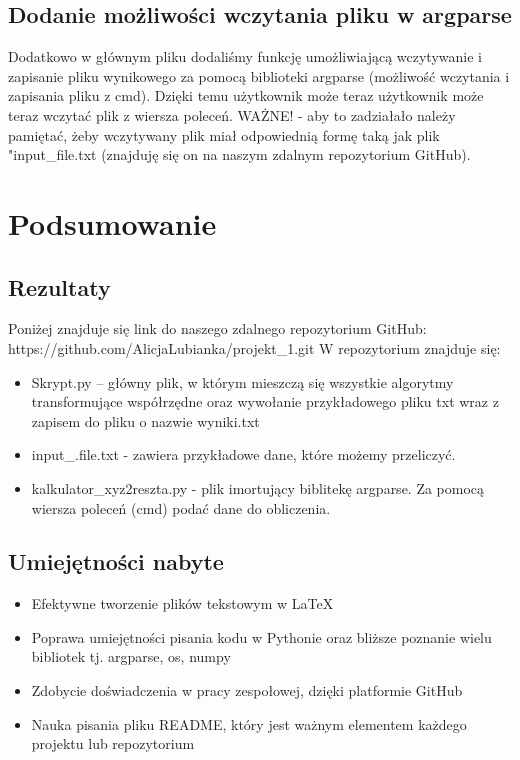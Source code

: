 \documentclass[10pt,a4paper]{article}
\begin{document}
	

	
	\subsection{Dodanie możliwości wczytania pliku w argparse}
	Dodatkowo w głównym pliku dodaliśmy funkcję umożliwiającą wczytywanie i zapisanie pliku wynikowego za pomocą biblioteki argparse (możliwość wczytania i zapisania pliku z cmd). Dzięki temu użytkownik może teraz użytkownik może teraz wczytać plik z wiersza poleceń. 
	WAŻNE! - aby to zadziałało należy pamiętać, żeby wczytywany plik miał odpowiednią formę taką jak plik "input\_{}file.txt (znajduję się on na naszym zdalnym repozytorium GitHub).
	
	\section{Podsumowanie}
	
	\subsection{Rezultaty}
		Poniżej znajduje się link do naszego zdalnego repozytorium GitHub:
	\newline
	https://github.com/AlicjaLubianka/projekt\_{}1.git
	\newline
	W repozytorium znajduje się:
	\begin{itemize}
	 \item Skrypt.py – główny plik, w którym mieszczą się wszystkie algorytmy transformujące współrzędne oraz wywołanie przykładowego pliku txt wraz z zapisem do pliku o nazwie wyniki.txt
	 \item input\_{}.file.txt - zawiera przykładowe dane, które możemy przeliczyć.
	 \item kalkulator\_{}xyz2reszta.py - plik imortujący biblitekę argparse. Za pomocą wiersza poleceń (cmd) podać dane do obliczenia.
	 
	\end{itemize}
	
	\subsection{Umiejętności nabyte}
	\begin{itemize}
	\item Efektywne tworzenie plików tekstowym w LaTeX 
	\item Poprawa umiejętności pisania kodu w Pythonie oraz bliższe poznanie wielu bibliotek tj. argparse, os, numpy
	\item Zdobycie doświadczenia w pracy zespołowej, dzięki platformie GitHub
	\item Nauka pisania pliku README, który jest ważnym elementem każdego projektu lub repozytorium
	\end{itemize}
	
\end{document}
